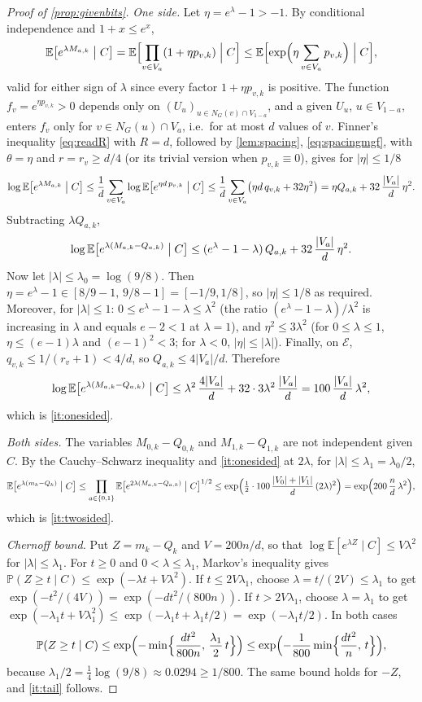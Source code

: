 \documentclass[11pt,a4paper]{article}
\theoremstyle{plain}
\theoremstyle{definition}
\theoremstyle{remark}
\newcommand{\EE}{\mathbb E}
\newcommand{\PP}{\mathbb P}
\newcommand{\cE}{\mathcal E}
\begin{document}
\begin{proof}[Proof of \cref{prop:givenbits}]
\emph{One side.} Let $\eta=e^\lambda-1>-1$. By conditional independence and $1+x\le e^x$,
\[
 \EE\bigl[e^{\lambda M_{a,k}}\bigm|C\bigr]=\EE\Bigl[\prod_{v\in V_a}(1+\eta p_{v,k})\Bigm|C\Bigr]\le\EE\Bigl[\exp\Bigl(\eta\sum_{v\in V_a}p_{v,k}\Bigr)\Bigm|C\Bigr],
\]
valid for either sign of $\lambda$ since every factor $1+\eta p_{v,k}$ is positive. The function $f_v=e^{\eta p_{v,k}}>0$ depends only on $(U_u)_{u\in N_G(v)\cap V_{1-a}}$, and a given $U_u$, $u\in V_{1-a}$, enters $f_v$ only for $v\in N_G(u)\cap V_a$, i.e.\ for at most $d$ values of $v$. Finner's inequality \eqref{eq:readR} with $R=d$, followed by \cref{lem:spacing}, \eqref{eq:spacingmgf}, with $\theta=\eta$ and $r=r_v\ge d/4$ (or its trivial version when $p_{v,k}\equiv0$), gives for $|\eta|\le1/8$
\[
 \log\EE\bigl[e^{\lambda M_{a,k}}\bigm|C\bigr]\le\frac1d\sum_{v\in V_a}\log\EE\bigl[e^{\eta d\,p_{v,k}}\bigm|C\bigr]\le\frac1d\sum_{v\in V_a}\bigl(\eta d\,q_{v,k}+32\eta^2\bigr)=\eta Q_{a,k}+32\,\frac{|V_a|}d\,\eta^2 .
\]
Subtracting $\lambda Q_{a,k}$,
\[
 \log\EE\bigl[e^{\lambda(M_{a,k}-Q_{a,k})}\bigm|C\bigr]\le(e^\lambda-1-\lambda)\,Q_{a,k}+32\,\frac{|V_a|}d\,\eta^2 .
\]
Now let $|\lambda|\le\lambda_0=\log(9/8)$. Then $\eta=e^\lambda-1\in[8/9-1,\,9/8-1]=[-1/9,1/8]$, so $|\eta|\le1/8$ as required. Moreover, for $|\lambda|\le1$: $0\le e^\lambda-1-\lambda\le\lambda^2$ (the ratio $(e^\lambda-1-\lambda)/\lambda^2$ is increasing in $\lambda$ and equals $e-2<1$ at $\lambda=1$), and $\eta^2\le3\lambda^2$ (for $0\le\lambda\le1$, $\eta\le(e-1)\lambda$ and $(e-1)^2<3$; for $\lambda<0$, $|\eta|\le|\lambda|$). Finally, on $\cE$, $q_{v,k}\le1/(r_v+1)<4/d$, so $Q_{a,k}\le4|V_a|/d$. Therefore
\[
 \log\EE\bigl[e^{\lambda(M_{a,k}-Q_{a,k})}\bigm|C\bigr]\le\lambda^2\,\frac{4|V_a|}d+32\cdot3\lambda^2\,\frac{|V_a|}d=100\,\frac{|V_a|}d\,\lambda^2,
\]
which is \ref{it:onesided}.

\emph{Both sides.} The variables $M_{0,k}-Q_{0,k}$ and $M_{1,k}-Q_{1,k}$ are not independent given $C$. By the Cauchy--Schwarz inequality and \ref{it:onesided} at $2\lambda$, for $|\lambda|\le\lambda_1=\lambda_0/2$,
\[
 \EE\bigl[e^{\lambda(m_k-Q_k)}\bigm|C\bigr]\le\prod_{a\in\{0,1\}}\EE\bigl[e^{2\lambda(M_{a,k}-Q_{a,k})}\bigm|C\bigr]^{1/2}\le\exp\Bigl(\tfrac12\cdot100\,\frac{|V_0|+|V_1|}d\,(2\lambda)^2\Bigr)=\exp\Bigl(200\,\frac nd\,\lambda^2\Bigr),
\]
which is \ref{it:twosided}.

\emph{Chernoff bound.} Put $Z=m_k-Q_k$ and $V=200n/d$, so that $\log\EE[e^{\lambda Z}\mid C]\le V\lambda^2$ for $|\lambda|\le\lambda_1$. For $t\ge0$ and $0<\lambda\le\lambda_1$, Markov's inequality gives $\PP(Z\ge t\mid C)\le\exp(-\lambda t+V\lambda^2)$. If $t\le2V\lambda_1$, choose $\lambda=t/(2V)\le\lambda_1$ to get $\exp(-t^2/(4V))=\exp(-dt^2/(800n))$. If $t>2V\lambda_1$, choose $\lambda=\lambda_1$ to get $\exp(-\lambda_1t+V\lambda_1^2)\le\exp(-\lambda_1t+\lambda_1t/2)=\exp(-\lambda_1t/2)$. In both cases
\[
 \PP(Z\ge t\mid C)\le\exp\Bigl(-\min\Bigl\{\frac{dt^2}{800n},\,\frac{\lambda_1}2\,t\Bigr\}\Bigr)\le\exp\Bigl(-\frac1{800}\min\Bigl\{\frac{dt^2}n,\,t\Bigr\}\Bigr),
\]
because $\lambda_1/2=\tfrac14\log(9/8)\approx0.0294\ge1/800$. The same bound holds for $-Z$, and \ref{it:tail} follows.
\end{proof}
\end{document}
